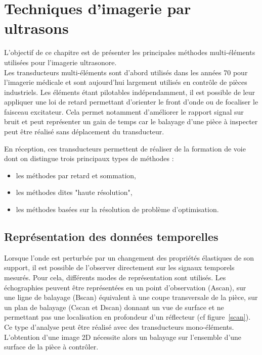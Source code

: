 \chapter{Techniques d'imagerie par ultrasons}

 L'objectif de ce chapitre est de présenter les principales méthodes multi-éléments utilisées pour l'imagerie ultrasonore. \\

Les transducteurs multi-éléments sont d'abord utilisés dans les années 70 pour l'imagerie médicale et sont aujourd'hui largement utilisés en contrôle de pièces industriels. Les éléments étant pilotables indépendamment, il est possible de leur appliquer une loi de retard permettant d'orienter le front d'onde ou de focaliser le faisceau excitateur. Cela permet notamment d'améliorer le rapport signal sur bruit et peut représenter un gain de temps car le balayage d'une pièce à inspecter peut être réalisé sans déplacement du transducteur.

En réception, ces transducteurs permettent de réaliser de la formation de voie dont on distingue trois principaux types de méthodes : 
\begin{itemize}
	\item les méthodes par retard et sommation,
	\item les méthodes dites "haute résolution",
	\item les méthodes basées sur la résolution de problème d'optimisation.
\end{itemize} 


\section{Représentation des données temporelles}

Lorsque l'onde est perturbée par un changement des propriétés élastiques de son support, il est possible de l'observer directement sur les signaux temporels mesurés. Pour cela, différents modes de représentation sont utilisés. Les échographies peuvent être représentées en un point d'observation (Ascan), sur une ligne de balayage (Bscan) équivalent à une coupe transversale de la pièce,  sur un plan de balayage (Cscan et Dscan) donnant un vue de surface et ne permettant pas une localisation en profondeur d'un réflecteur (cf figure~\ref{scan}).\\
 
Ce type d'analyse peut être réalisé avec des transducteurs mono-éléments. L'obtention d'une image 2D nécessite alors un balayage sur l'ensemble d'une surface de la pièce à contrôler. 

